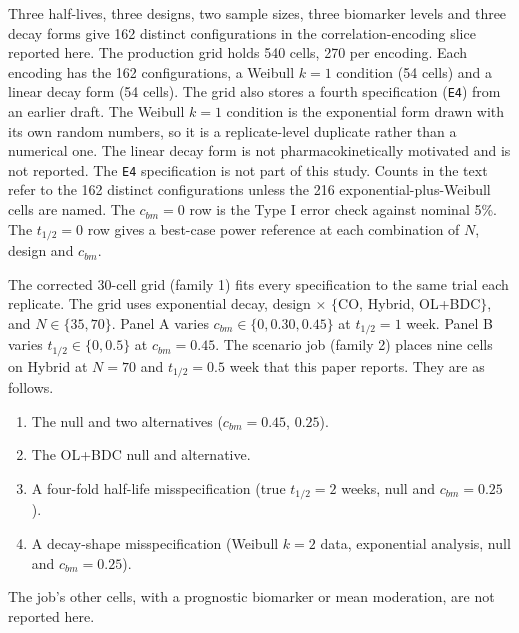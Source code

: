 \documentclass[
  11pt,
]{article}
\providecommand{\tightlist}{%
  \setlength{\itemsep}{0pt}\setlength{\parskip}{0pt}}
\begin{document}
Three half-lives, three designs, two sample sizes, three biomarker
levels and three decay forms give 162 distinct configurations in the
correlation-encoding slice reported here. The production grid holds
540 cells, 270 per encoding. Each encoding has the 162
configurations, a Weibull \(k = 1\) condition (54 cells) and a linear
decay form (54 cells). The grid also stores a fourth specification
(\texttt{E4}) from an earlier draft. The Weibull \(k = 1\) condition is the
exponential form drawn with its own random numbers, so it is a
replicate-level duplicate rather than a numerical one. The linear
decay form is not pharmacokinetically motivated and is not reported.
The \texttt{E4} specification is not part of
this study. Counts in the text refer to the 162 distinct
configurations unless the 216 exponential-plus-Weibull cells are
named. The \(c_{bm} = 0\) row is the Type I error check against
nominal 5\%. The \(t_{1/2} = 0\) row gives a best-case power reference
at each combination of \(N\), design and \(c_{bm}\).

The corrected 30-cell grid (family 1) fits every specification
to the same trial each replicate. The grid uses exponential decay,
design \(\times\) \(\{\)CO, Hybrid, OL+BDC\(\}\), and \(N \in \{35, 70\}\).
Panel A varies \(c_{bm} \in \{0, 0.30, 0.45\}\) at \(t_{1/2} = 1\) week.
Panel B varies \(t_{1/2} \in \{0, 0.5\}\) at \(c_{bm} = 0.45\). The
scenario job (family 2) places nine cells on Hybrid at \(N = 70\) and
\(t_{1/2} = 0.5\) week that this paper reports. They are as follows.

\begin{enumerate}
\def\labelenumi{\alph{enumi})}
\tightlist
\item
  The null and two alternatives (\(c_{bm} = 0.45\), \(0.25\)).
\item
  The OL+BDC null and alternative.
\item
  A four-fold half-life misspecification (true \(t_{1/2} = 2\) weeks,
  null and \(c_{bm} = 0.25\)).
\item
  A decay-shape misspecification (Weibull \(k = 2\) data, exponential
  analysis, null and \(c_{bm} = 0.25\)).
\end{enumerate}

The job's other cells, with a prognostic biomarker or mean
moderation, are not reported here.
\end{document}
